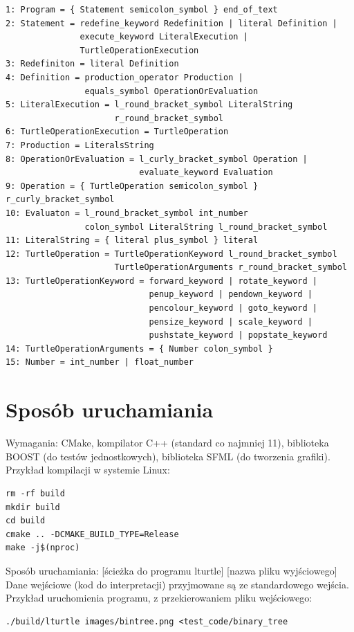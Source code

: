 \documentclass{article}
\begin{document}
\begin{lstlisting}
1: Program = { Statement semicolon_symbol } end_of_text
2: Statement = redefine_keyword Redefinition | literal Definition |
               execute_keyword LiteralExecution | 
               TurtleOperationExecution
3: Redefiniton = literal Definition
4: Definition = production_operator Production | 
                equals_symbol OperationOrEvaluation
5: LiteralExecution = l_round_bracket_symbol LiteralString 
                      r_round_bracket_symbol
6: TurtleOperationExecution = TurtleOperation
7: Production = LiteralsString
8: OperationOrEvaluation = l_curly_bracket_symbol Operation |
                           evaluate_keyword Evaluation
9: Operation = { TurtleOperation semicolon_symbol } r_curly_bracket_symbol
10: Evaluaton = l_round_bracket_symbol int_number
                colon_symbol LiteralString l_round_bracket_symbol
11: LiteralString = { literal plus_symbol } literal
12: TurtleOperation = TurtleOperationKeyword l_round_bracket_symbol
                      TurtleOperationArguments r_round_bracket_symbol
13: TurtleOperationKeyword = forward_keyword | rotate_keyword |
                             penup_keyword | pendown_keyword |
                             pencolour_keyword | goto_keyword |
                             pensize_keyword | scale_keyword |
                             pushstate_keyword | popstate_keyword
14: TurtleOperationArguments = { Number colon_symbol }
15: Number = int_number | float_number
\end{lstlisting}

\section{Sposób uruchamiania}
Wymagania: CMake, kompilator C++ (standard co najmniej 11), biblioteka BOOST (do testów jednostkowych), biblioteka SFML (do tworzenia grafiki).
Przykład kompilacji w systemie Linux:
\begin{lstlisting}
rm -rf build
mkdir build
cd build
cmake .. -DCMAKE_BUILD_TYPE=Release
make -j$(nproc)
\end{lstlisting}
Sposób uruchamiania:\newline{}
[ścieżka do programu lturtle] [nazwa pliku wyjściowego]\newline{}
Dane wejściowe (kod do interpretacji) przyjmowane są ze standardowego wejścia. Przykład uruchomienia programu, z przekierowaniem pliku wejściowego:\newline{}
\begin{lstlisting}
./build/lturtle images/bintree.png <test_code/binary_tree  
\end{lstlisting}
\end{document}
